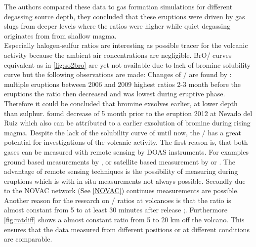 \documentclass  [
  paper    = a4,
  BCOR     = 10mm,
  twoside,
  fontsize = 12pt,
  fleqn,
  toc      = bibnumbered,
  toc      = listofnumbered,
  numbers  = noendperiod,
  headings = normal,
  listof   = leveldown,
  version  = 3.03
]                                       {scrreprt}
\begin{document}
	The authors compared these data to gas formation simulations for different degassing source depth, they concluded that these eruptions were driven by gas slugs from deeper levels where the ratios were higher while quiet degassing originates from from shallow magma.\\
	Especially halogen-sulfur ratios are interesting as possible tracer for the volcanic activity because the ambient air concentrations are negligible.
	BrO/  curves equivalent as in \cref{fig:so2bro} are yet not available due to lack of  bromine solubility curve but the following observations are made:
	Changes of /  are found by \citet{bobrowski2006bromine}: multiple eruptions between 2006 and 2009 highest ratios 2-3 month before the eruptions the ratio then decreased and was lowest during eruptive phase. Therefore it could be concluded that bromine exsolves earlier, at lower depth than sulphur.
	\citet{lubcke2014bro} found decrease of   5 month prior to the eruption 2012 at Nevado del Ruiz which also can be attributed to a earlier exsolution of bromine during rising magma.
	Despite the lack of the solubility curve of   until now, the /  has a great potential for investigations of the volcanic activity. The first reason is, that both gases can be measured with remote sensing by DOAS instruments. For examples ground based measurements by \citet{bobrowski2007reactive}, \citet{lubcke2014optical} or satellite based measurement by \citet{hormann2013systematic} or \citet{beirle2014estimating}. The advantage of remote sensing techniques is the possibility of measuring during eruptions which is with in situ measurements not always possible.
	Secondly due to the NOVAC network (See \cref{NOVAC}) continues measurements are possible.\\
	Another reason for the research on /  ratios at volcanoes is that the ratio is almost constant from 5 to at least 30 minutes after release \citep{bobrowski2007reactive};\citep{lubcke2014optical}. Furthermore \cref{fig:ratdiff} shows a almost constant ratio from 5 to 20 km off the volcano. This ensures that the data measured from different positions or at different conditions are comparable.\\
	\\
\end{document}
